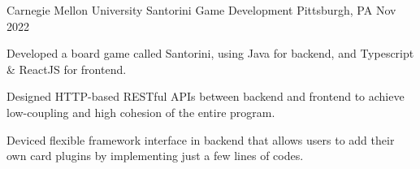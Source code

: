 \begin{cventries}

  \cventry
    {Carnegie Mellon University} %
    {Santorini Game Development} %
    {Pittsburgh, PA} %
    {Nov 2022} %
    {
      \begin{cvitems} %
        \item {Developed a board game called Santorini, using Java for backend, and Typescript \& ReactJS for 
        frontend.}
        \item {Designed HTTP-based RESTful APIs between backend and frontend to achieve low-coupling and 
        high cohesion of the entire program.}
        \item {Deviced flexible framework interface in backend that allows users to add their own card plugins 
        by implementing just a few lines of codes.}
      \end{cvitems}
    }

\end{cventries}